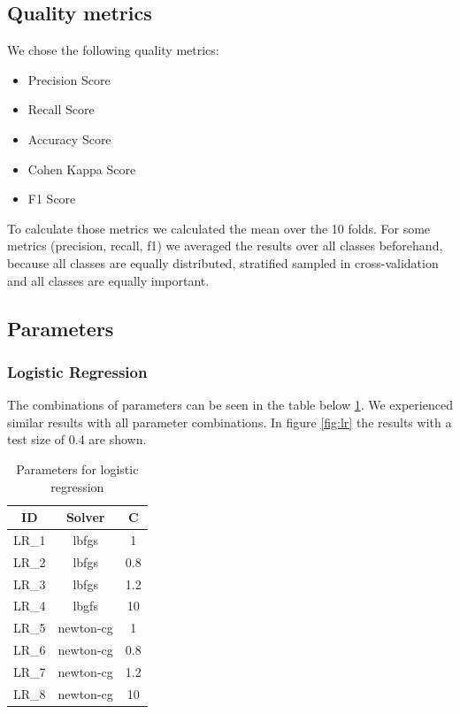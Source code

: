 \documentclass{sig-alternate-05-2015}
\begin{document}
\subsection{Quality metrics}

We chose the following quality metrics:
\begin{itemize}
	\item Precision Score
	\item Recall Score
	\item Accuracy Score
	\item Cohen Kappa Score
	\item F1 Score
\end{itemize}

To calculate those metrics we calculated the mean over the 10 folds.
For some metrics (precision, recall, f1) we averaged the results over all classes beforehand, because all classes are equally distributed, stratified sampled in cross-validation and all classes are equally important.

\subsection{Parameters}

\subsubsection{Logistic Regression}
The combinations of parameters can be seen in the table below \ref{tbl:logreg}.
We experienced similar results with all parameter combinations.
In figure \ref{fig:lr} the results with a test size of 0.4 are shown.

\begin{table}[h]
\centering
\caption{Parameters for logistic regression}
\label{tbl:logreg}
\begin{tabular}{|c|c|c|}
\hline
ID & Solver & C \\ 
\hline 
LR\_1 & lbfgs & 1 \\ 
\hline 
LR\_2 & lbfgs & 0.8 \\ 
\hline 
LR\_3 & lbfgs & 1.2 \\ 
\hline 
LR\_4 & lbgfs & 10 \\ 
\hline 
LR\_5 & newton-cg & 1 \\ 
\hline 
LR\_6 & newton-cg & 0.8 \\ 
\hline 
LR\_7 & newton-cg & 1.2 \\ 
\hline 
LR\_8 & newton-cg & 10 \\ 
\hline
\end{tabular} 
\end{table}
\end{document}

